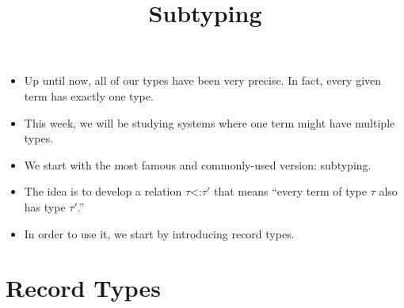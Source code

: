 \documentclass{lecturenotes}
\title{Subtyping}
\newcommand{\utype}{\textsf{unit}\xspace}
\newcommand{\prodtype}[2]{\ensuremath{#1 \times #2}}
\newcommand{\sumtype}[2]{\ensuremath{#1 + #2}}
\newcommand{\subtype}{\ensuremath{\mathrel{\mathord{<}\mathord{:}}}}
\begin{document}
\maketitle

\begin{itemize}
\item Up until now, all of our types have been very precise.
  In fact, every given term has exactly one type.
\item This week, we will be studying systems where one term might have multiple types.
\item We start with the most famous and commonly-used version: subtyping.
\item The idea is to develop a relation $\tau \subtype \tau'$ that means ``every term of type $\tau$ also has type $\tau'$.''
\item In order to use it, we start by introducing record types.
\end{itemize}

\section{Record Types}
\label{sec:record-types}

\begin{syntax}
  \abstractCategory[Labels]{\ell}
  \category[Types]{\tau} \alternative{\utype}  \alternative{\prodtype{\tau_1}{\tau_2}} \alternative{\sumtype{\tau_1}{\tau_2}} 
   \alternative{\dots}  
\end{syntax}


\end{document}
